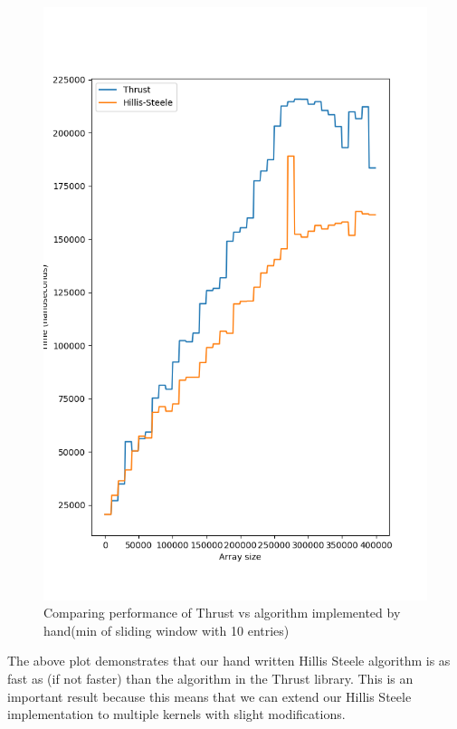 \documentclass{article}
\begin{document}
\begin{figure}[H]
\hfill\includegraphics[scale=0.5]{Graphics/thrusthillis.png}\hspace*{\fill}
\caption{Comparing performance of Thrust vs algorithm implemented by hand(min of sliding window with 10 entries)}
\end{figure}
The above plot demonstrates that our hand written Hillis Steele algorithm is as fast as (if not faster) than the algorithm in the Thrust library. This is an important result because this means that we can extend our Hillis Steele implementation to multiple kernels with slight modifications.
\end{document}

